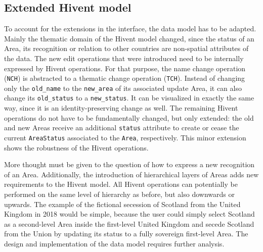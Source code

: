 


\subsection{Extended Hivent model} %
\label{sub:extended_hivent_model}

To account for the extensions in the interface, the data model has to be adapted. Mainly the thematic domain of the Hivent model changed, since the status of an Area, its recognition or relation to other countries are non-spatial attributes of the data. The new edit operations that were introduced need to be internally expressed by Hivent operations. For that purpose, the name change operation (\texttt{NCH}) is abstracted to a thematic change operation (\texttt{TCH}). Instead of changing only the \texttt{old\_name} to the \texttt{new\_area} of its associated update Area, it can also change its \texttt{old\_status} to a \texttt{new\_status}. It can be visualized in exactly the same way, since it is an identity-preserving change as well. The remaining Hivent operations do not have to be fundamentally changed, but only extended: the old and new Areas receive an additional \texttt{status} attribute to create or cease the current \texttt{AreaStatus} associated to the \texttt{Area}, respectively. This minor extension shows the robustness of the Hivent operations.

More thought must be given to the question of how to express a new recognition of an Area. Additionally, the introduction of hierarchical layers of Areas adds new requirements to the Hivent model. All Hivent operations can potentially be performed on the same level of hierarchy as before, but also downwards or upwards. The example of the fictional secession of Scotland from the United Kingdom in 2018 would be simple, because the user could simply select Scotland as a second-level Area inside the first-level United Kingdom and secede Scotland from the Union by updating its status to a fully sovereign first-level Area. The design and implementation of the data model requires further analysis.

